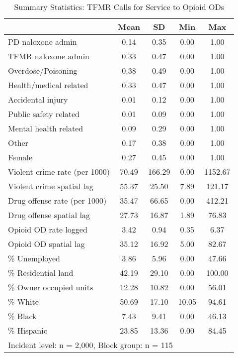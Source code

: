 \begin{table}[htbp]\centering
\def\sym#1{\ifmmode^{#1}\else\(^{#1}\)\fi}
\caption{\centering Summary Statistics: TFMR Calls for Service to Opioid ODs}
\begin{tabular}{l*{1}{cccc}}
\toprule
                &     Mean&       SD&      Min&      Max\\
\midrule
PD naloxone admin&     0.14&     0.35&     0.00&     1.00\\
TFMR naloxone admin&     0.33&     0.47&     0.00&     1.00\\
Overdose/Poisoning&     0.38&     0.49&     0.00&     1.00\\
Health/medical related&     0.33&     0.47&     0.00&     1.00\\
Accidental injury&     0.01&     0.12&     0.00&     1.00\\
Public safety related&     0.01&     0.09&     0.00&     1.00\\
Mental health related&     0.09&     0.29&     0.00&     1.00\\
Other           &     0.17&     0.38&     0.00&     1.00\\
Female          &     0.27&     0.45&     0.00&     1.00\\
Violent crime rate (per 1000)&    70.49&   166.29&     0.00&  1152.67\\
Violent crime spatial lag&    55.37&    25.50&     7.89&   121.17\\
Drug offense rate (per 1000)&    35.47&    66.65&     0.00&   412.21\\
Drug offense spatial lag&    27.73&    16.87&     1.89&    76.83\\
Opioid OD rate logged&     3.42&     0.94&     0.35&     6.37\\
Opioid OD spatial lag&    35.12&    16.92&     5.00&    82.67\\
\% Unemployed   &     3.86&     5.96&     0.00&    47.66\\
\% Residential land&    42.19&    29.10&     0.00&   100.00\\
\% Owner occupied units&    12.28&    10.82&     0.00&    56.01\\
\% White        &    50.69&    17.10&    10.05&    94.61\\
\% Black        &     7.43&     9.41&     0.00&    46.13\\
\% Hispanic     &    23.85&    13.36&     0.00&    84.45\\
\bottomrule
\multicolumn{5}{l}{\footnotesize Incident level: n = 2,000, Block group: n = 115}\\
\end{tabular}
\end{table}
